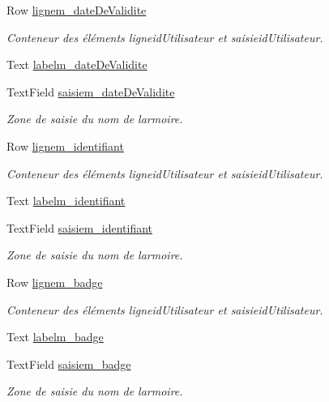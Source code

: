 \begin{DoxyCompactItemize}
Row \hyperlink{class_ajout_utilisateur_a480390b00c9e7f2c0195b2b3744e7c5f}{lignem\+\_\+date\+De\+Validite}
\begin{DoxyCompactList}\small\item\em Conteneur des éléments ligneid\+Utilisateur et saisieid\+Utilisateur. \end{DoxyCompactList}\item 
Text \hyperlink{class_ajout_utilisateur_a887388004f216931096d4f82e72aaeb2}{labelm\+\_\+date\+De\+Validite}
\item 
Text\+Field \hyperlink{class_ajout_utilisateur_a921702e1a95f793dd33606470670356d}{saisiem\+\_\+date\+De\+Validite}
\begin{DoxyCompactList}\small\item\em Zone de saisie du nom de l\textquotesingle{}armoire. \end{DoxyCompactList}\item 
Row \hyperlink{class_ajout_utilisateur_a24d0e86ebfa66d27fffd95c744f128e0}{lignem\+\_\+identifiant}
\begin{DoxyCompactList}\small\item\em Conteneur des éléments ligneid\+Utilisateur et saisieid\+Utilisateur. \end{DoxyCompactList}\item 
Text \hyperlink{class_ajout_utilisateur_a79b77b7e2d67bd5fc657e6e24e0ef427}{labelm\+\_\+identifiant}
\item 
Text\+Field \hyperlink{class_ajout_utilisateur_a16297d17e90159941c80a0f7f685f441}{saisiem\+\_\+identifiant}
\begin{DoxyCompactList}\small\item\em Zone de saisie du nom de l\textquotesingle{}armoire. \end{DoxyCompactList}\item 
Row \hyperlink{class_ajout_utilisateur_a7cb1d02fdc12c469e6fc0f83112527a8}{lignem\+\_\+badge}
\begin{DoxyCompactList}\small\item\em Conteneur des éléments ligneid\+Utilisateur et saisieid\+Utilisateur. \end{DoxyCompactList}\item 
Text \hyperlink{class_ajout_utilisateur_acfdd54d13a840a81d6889dd06fd456bc}{labelm\+\_\+badge}
\item 
Text\+Field \hyperlink{class_ajout_utilisateur_af3d7e0b7611587d783ef4d873330ed3b}{saisiem\+\_\+badge}
\begin{DoxyCompactList}\small\item\em Zone de saisie du nom de l\textquotesingle{}armoire. \end{DoxyCompactList}\item 

\end{DoxyCompactItemize}
